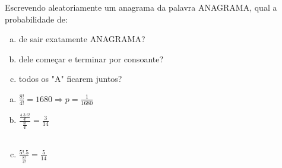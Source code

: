 \begin{ex}
 Escrevendo aleatoriamente um anagrama da palavra ANAGRAMA, qual a probabilidade de:
    \begin{enumerate}[(a)]
    \item de sair exatamente ANAGRAMA?
    \item dele começar e terminar por consoante?
    \item todos os "A" ficarem juntos?
    \end{enumerate}
     \begin{sol}
      \phantom{A}
       \begin{enumerate} [(a)]
           \item $\frac{8!}{4!}= 1680\Longrightarrow p=\frac{1}{1680}$
           \item $\frac{\frac{4.3.6!}{4!}}{\frac{8!}{4!}}=\frac{3}{14}$  \\
              \\
           \item $\frac{5!.5}{\frac{8!}{4!}}=\frac{5}{14}$\\
            
       \end{enumerate}
     \end{sol}
\end{ex}